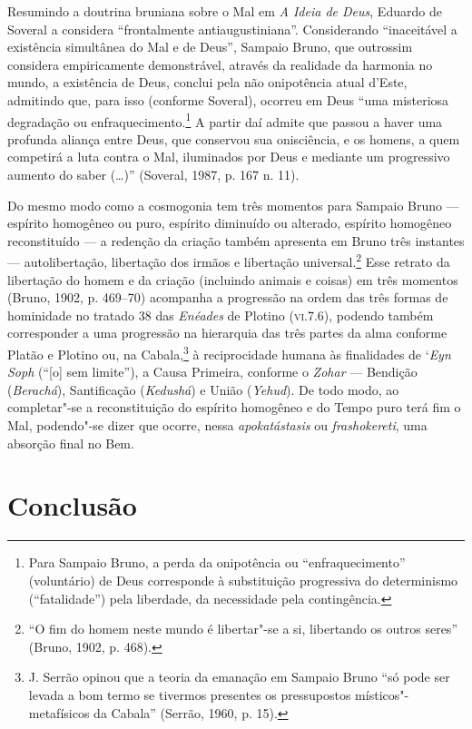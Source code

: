 Resumindo a doutrina bruniana sobre o Mal em \emph{A Ideia
de Deus}, Eduardo de Soveral a considera “frontalmente
antiaugustiniana”. Considerando “inaceitável a existência
simultânea do Mal e de Deus”, Sampaio Bruno, que outrossim
considera empiricamente demonstrável, através da realidade da
harmonia no mundo, a existência de Deus, conclui pela
não onipotência atual d'Este, admitindo que, para isso (conforme
Soveral), ocorreu em Deus “uma misteriosa degradação ou
enfraquecimento.\footnote{ Para Sampaio Bruno, a perda da
onipotência ou “enfraquecimento” (voluntário) de Deus
corresponde à substituição progressiva do determinismo
(“fatalidade”) pela liberdade, da necessidade pela
contingência.} A partir daí admite que passou a haver uma
profunda aliança entre Deus, que conservou sua onisciência, e os
homens, a quem competirá a luta contra o Mal, iluminados por
Deus e mediante um progressivo aumento do saber (\ldots{})” (Soveral,
1987, p. 167 n. 11). 

Do mesmo modo como a cosmogonia tem três momentos para
Sampaio Bruno --- espírito homogêneo ou puro, espírito diminuído
ou alterado, espírito homogêneo reconstituído --- a redenção da
criação também apresenta em Bruno três instantes ---
autolibertação, libertação dos irmãos e libertação
universal.\footnote{ “O fim do homem neste mundo é libertar"-se a
si, libertando os outros seres” (Bruno, 1902, p. 468).} Esse
retrato da libertação do homem e da criação (incluindo animais e
coisas) em três momentos (Bruno, 1902, p. 469--70) acompanha a
progressão na ordem das três formas de hominidade no tratado 38
das \emph{Enéades} de Plotino (\textsc{vi}.7.6), podendo também
corresponder a uma progressão na hierarquia das três partes da
alma conforme Platão e Plotino ou, na Cabala,\footnote{ J. Serrão
opinou que a teoria da emanação em Sampaio Bruno “só pode ser
levada a bom termo se tivermos presentes os pressupostos
místicos"-metafísicos da Cabala” (Serrão, 1960, p. 15).} à
reciprocidade humana às finalidades de ‘\emph{Eyn Soph} (“[o]
sem limite”), a Causa Primeira, conforme o \emph{Zohar} ---
Bendição (\emph{Berachá}), Santificação (\emph{Kedushá}) e
União (\emph{Yehud}). De todo modo, ao completar"-se a
reconstituição do espírito homogêneo e do Tempo puro terá fim o
Mal, podendo"-se dizer que ocorre, nessa \emph{apokatástasis}
ou \emph{frashokereti}, uma absorção final no Bem.

\section{Conclusão}

